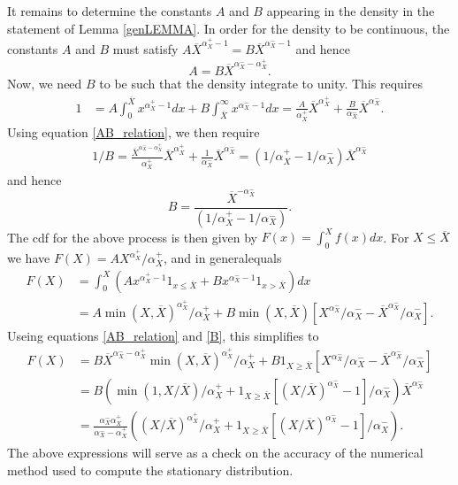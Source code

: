 \documentclass[11pt]{article}
\theoremstyle{plain}
\begin{document}
It remains to determine the constants $A$ and $B$ appearing in the density in the statement of Lemma \ref{genLEMMA}. In order for the density to be continuous, the constants $A$ and $B$ must satisfy $A \overline{X}^{\alpha^+_X-1} = B \overline{X}^{\alpha^-_X-1}$ and hence
\begin{equation}
A = B \overline{X}^{\alpha^-_X-\alpha^+_X}.
\label{AB_relation}
\end{equation}
Now, we need $B$ to be such that the density integrate to unity. This requires 
\begin{align*}
1 & = A\int_{0}^{\overline{X}} x^{\alpha^+_X-1}dx + B \int_{\overline{X}}^{\infty}x^{\alpha^-_X-1}dx
 = \frac{A}{\alpha^+_X} \overline{X}^{\alpha^+_X} + \frac{B}{\alpha^-_X} \overline{X}^{\alpha^-_X}.
\end{align*}
Using equation \eqref{AB_relation}, we then require
\begin{align*}
1/B = \frac{\overline{X}^{\alpha^-_X-\alpha^+_X}}{\alpha^+_X} \overline{X}^{\alpha^+_X} + \frac{1}{\alpha^-_X} \overline{X}^{\alpha^-_X} = (1/\alpha^+_X - 1/\alpha^-_X) \overline{X}^{\alpha^-_X}
\end{align*}
and hence 
\begin{equation}
B = \frac{\overline{X}^{-\alpha^-_X}}{(1/\alpha^+_X - 1/\alpha^-_X)}.
\label{B}
\end{equation}%
The cdf for the above process is then given by $F(x) = \int_{0}^{X}f(x)dx$. For $X \leq \overline{X}$ we have $F(X) = A X^{\alpha^+_X}/\alpha^+_X$, and in generalequals 
\begin{align*}
F(X) & = \int_{0}^{X} {\left(A x^{\alpha^+_X-1}1_{x \leq \overline{X}} + B x^{\alpha^-_X-1}1_{x > \overline{X}} \right)}dx
\\ & = A \min(X,\overline{X})^{\alpha^+_X}/\alpha^+_X + B \min(X,\overline{X}) {\left[X^{\alpha^-_X}/\alpha^-_X - \overline{X}^{\alpha^-_X}/\alpha^-_X\right]}.
\end{align*}
Useing equations \eqref{AB_relation} and \eqref{B}, this simplifies to 
\begin{align*}
F(X) & = B \overline{X}^{\alpha^-_X-\alpha^+_X}\min(X,\overline{X})^{\alpha^+_X}/\alpha^+_X + B 1_{X \geq \overline{X}}{\left[X^{\alpha^-_X}/\alpha^-_X - \overline{X}^{\alpha^-_X}/\alpha^-_X\right]}
\\ & = B {\left(\min(1,X/\overline{X})/\alpha^+_X + 1_{X \geq \overline{X}}{\left[(X/\overline{X})^{\alpha^-_X} - 1\right]}/\alpha^-_X\right)}\overline{X}^{\alpha^-_X}
\\ & = \frac{\alpha^-_X\alpha^+_X}{\alpha^-_X - \alpha^+_X} {\left((X/\overline{X})^{\alpha^+_X}/\alpha^+_X + 1_{X \geq \overline{X}}{\left[(X/\overline{X})^{\alpha^-_X} - 1\right]}/\alpha^-_X\right)}.
\end{align*}
The above expressions will serve as a check on the accuracy of the numerical method used to compute the stationary distribution.
\end{document}
